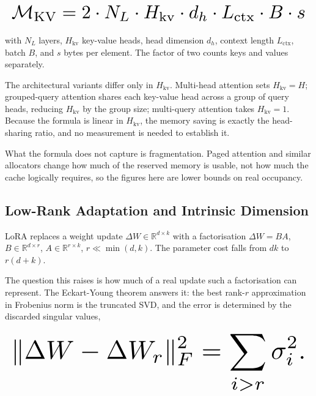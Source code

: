 \documentclass[10pt,journal,compsoc,twocolumn]{IEEEtran}
\begin{document}
\begin{equation}
\resizebox{\columnwidth}{!}{$\displaystyle
\begin{aligned}
\mathcal{M}_{\text{KV}} = 2 \cdot N_L \cdot H_{\text{kv}} \cdot d_h \cdot L_{\text{ctx}} \cdot B \cdot s
\end{aligned}
$}
\end{equation}








with $N_L$ layers, $H_{\text{kv}}$ key-value heads, head dimension $d_h$, context length $L_{\text{ctx}}$, batch $B$, and $s$ bytes per element. The factor of two counts keys and values separately.

The architectural variants differ only in $H_{\text{kv}}$. Multi-head attention sets $H_{\text{kv}} = H$; grouped-query attention shares each key-value head across a group of query heads, reducing $H_{\text{kv}}$ by the group size; multi-query attention takes $H_{\text{kv}} = 1$. Because the formula is linear in $H_{\text{kv}}$, the memory saving is exactly the head-sharing ratio, and no measurement is needed to establish it.

What the formula does not capture is fragmentation. Paged attention and similar allocators change how much of the reserved memory is usable, not how much the cache logically requires, so the figures here are lower bounds on real occupancy.


\subsection{Low-Rank Adaptation and Intrinsic Dimension}


LoRA replaces a weight update $\Delta W \in \mathbb{R}^{d \times k}$ with a factorisation $\Delta W = BA$, $B \in \mathbb{R}^{d \times r}$, $A \in \mathbb{R}^{r \times k}$, $r \ll \min(d, k)$. The parameter cost falls from $dk$ to $r(d + k)$.

The question this raises is how much of a real update such a factorisation can represent. The Eckart-Young theorem answers it: the best rank-$r$ approximation in Frobenius norm is the truncated SVD, and the error is determined by the discarded singular values,








\begin{equation}
\resizebox{\columnwidth}{!}{$\displaystyle
\begin{aligned}
\|\Delta W - \Delta W_r\|_F^2 = \sum_{i > r} \sigma_i^2 .
\end{aligned}
$}
\end{equation}
\end{document}
